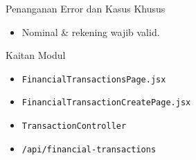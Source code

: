\begin{flowsection}{Penanganan Error dan Kasus Khusus}
\begin{itemize}
  \item Nominal \&  rekening wajib valid.
\end{itemize}
\end{flowsection}

\begin{flowsection}{Kaitan Modul}
\begin{itemize}
  \item \texttt{FinancialTransactionsPage.jsx}
  \item \texttt{FinancialTransactionCreatePage.jsx}
  \item \texttt{TransactionController}
  \item \texttt{/api/financial-transactions}
\end{itemize}
\end{flowsection}

